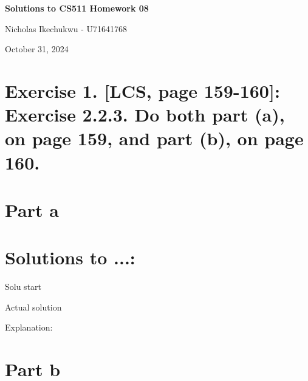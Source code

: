 \documentclass{article}
\begin{document}
\begin{center}
    \Large\textbf{Solutions to CS511 Homework 08}
    
    \vspace{0.5cm}
    
    \large Nicholas Ikechukwu - U71641768
    
    \vspace{0.3cm}
    
    \large October 31, 2024
\end{center}



\section*{Exercise 1. [LCS, page 159-160]: Exercise 2.2.3. Do both part (a), on page 159, and part (b),
on page 160. }

\section*{Part a}

\begin{mdframed}
\end{mdframed}

\section*{Solutions to ...:}

\vspace{1em}

Solu start

\vspace{1em}

Actual solution

\vspace{1em}


Explanation:
   

\newpage

\section*{Part b}

\begin{mdframed}
\end{mdframed}
\end{document}

